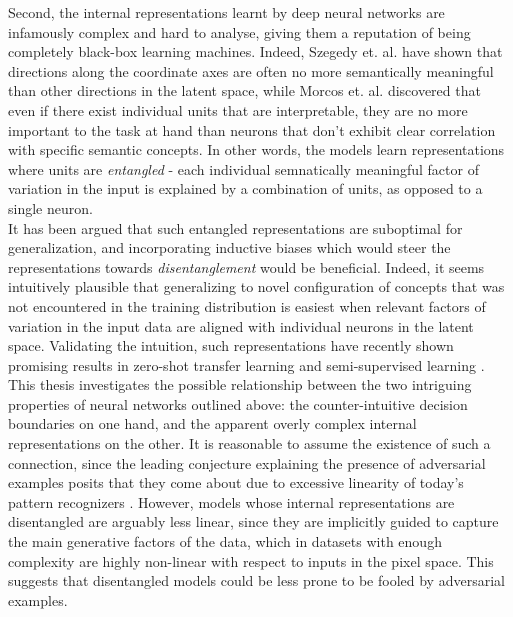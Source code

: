 \documentclass{report}
\begin{document}
\noindent Second, the internal representations learnt by deep neural networks are infamously complex and hard to analyse, giving them a reputation of being completely black-box learning machines. Indeed, Szegedy et. al. \cite{intriguing-properties} have shown that directions along the coordinate axes are often no more semantically meaningful than other directions in the latent space, while Morcos et. al. \cite{importance-single-directions} discovered that even if there exist individual units that are interpretable, they are no more important to the task at hand than neurons that don't exhibit clear correlation with specific semantic concepts. In other words, the models learn representations where units are \textit{entangled} - each individual semnatically meaningful factor of variation in the input is explained by a combination of units, as opposed to a single neuron. \\

\noindent It has been argued \cite{bengio-representation} that such entangled representations are suboptimal for generalization, and incorporating inductive biases which would steer the representations towards \textit{disentanglement} would be beneficial. Indeed, it seems intuitively plausible that generalizing to novel configuration of concepts that was not encountered in the training distribution is easiest when relevant factors of variation in the input data are aligned with individual neurons in the latent space. Validating the intuition, such representations have recently shown promising results in zero-shot transfer learning \cite{darla} and semi-supervised learning \cite{dgpose}. \\

\noindent This thesis investigates the possible relationship between the two intriguing properties of neural networks outlined above: the counter-intuitive decision boundaries on one hand, and the apparent overly complex internal representations on the other. It is reasonable to assume the existence of such a connection, since the leading conjecture explaining the presence of adversarial examples posits that they come about due to excessive linearity of today's pattern recognizers \cite{explaining-and-harnessing}. However, models whose internal representations are disentangled are arguably less linear, since they are implicitly guided to capture the main generative factors of the data, which in datasets with enough complexity are highly non-linear with respect to inputs in the pixel space. This suggests that disentangled models could be less prone to be fooled by adversarial examples. \\
\end{document}

